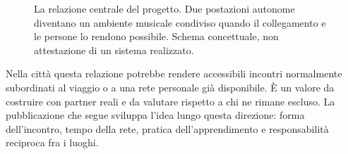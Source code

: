 \begin{figure}[htbp]
\centering
{}
\caption{La relazione centrale del progetto. Due postazioni autonome diventano un ambiente musicale condiviso quando il collegamento e le persone lo rendono possibile. Schema concettuale, non attestazione di un sistema realizzato.}
\end{figure}

\begin{samepage}
Nella città questa relazione potrebbe rendere accessibili incontri normalmente subordinati al viaggio o a una rete personale già disponibile. È un valore da costruire con partner reali e da valutare rispetto a chi ne rimane escluso. La pubblicazione che segue sviluppa l'idea lungo questa direzione: forma dell'incontro, tempo della rete, pratica dell'apprendimento e responsabilità reciproca fra i luoghi.
\end{samepage}
